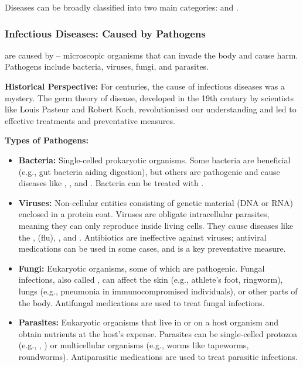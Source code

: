 Diseases can be broadly classified into two main categories:  and .

\subsubsection{Infectious Diseases: Caused by Pathogens}

 are caused by  – microscopic organisms that can invade the body and cause harm.  Pathogens include bacteria, viruses, fungi, and parasites.

\begin{marginnote}
\textbf{Historical Perspective:}  For centuries, the cause of infectious diseases was a mystery.  The germ theory of disease, developed in the 19th century by scientists like Louis Pasteur and Robert Koch, revolutionised our understanding and led to effective treatments and preventative measures. 
\end{marginnote}

\textbf{Types of Pathogens:}

\begin{itemize}
    \item \textbf{Bacteria:} Single-celled prokaryotic organisms. Some bacteria are beneficial (e.g., gut bacteria aiding digestion), but others are pathogenic and cause diseases like , , and . Bacteria can be treated with .
    \item \textbf{Viruses:}  Non-cellular entities consisting of genetic material (DNA or RNA) enclosed in a protein coat. Viruses are obligate intracellular parasites, meaning they can only reproduce inside living cells. They cause diseases like the ,  (flu), , and .  Antibiotics are ineffective against viruses; antiviral medications can be used in some cases, and  is a key preventative measure.
    \item \textbf{Fungi:} Eukaryotic organisms, some of which are pathogenic. Fungal infections, also called , can affect the skin (e.g., athlete's foot, ringworm), lungs (e.g., pneumonia in immunocompromised individuals), or other parts of the body. Antifungal medications are used to treat fungal infections.
    \item \textbf{Parasites:} Eukaryotic organisms that live in or on a host organism and obtain nutrients at the host's expense. Parasites can be single-celled protozoa (e.g., , ) or multicellular organisms (e.g., worms like tapeworms, roundworms). Antiparasitic medications are used to treat parasitic infections.
\end{itemize}

